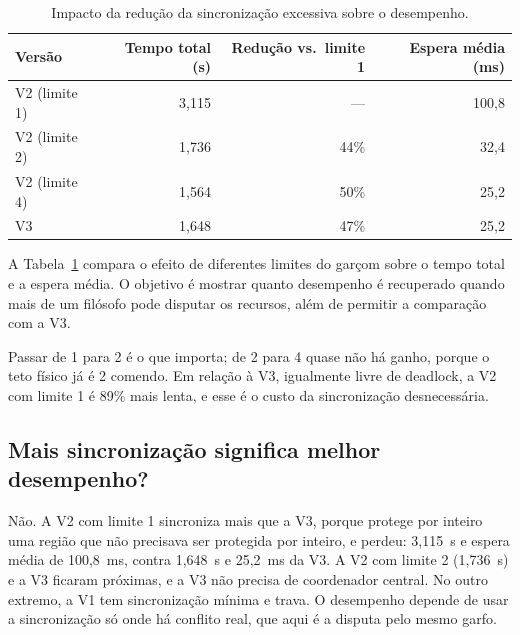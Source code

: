 \documentclass[12pt,brazil,a4paper]{article}
\begin{document}
\begin{table}[H]
\centering
\small
\begin{tabular}{lrrr}
\toprule
Versão & Tempo total (s) & Redução vs.\ limite 1 & Espera média (ms)\\
\midrule
V2 (limite 1) & 3,115 & --- & 100,8\\
V2 (limite 2) & 1,736 & 44\% & 32,4\\
V2 (limite 4) & 1,564 & 50\% & 25,2\\
V3 & 1,648 & 47\% & 25,2\\
\bottomrule
\end{tabular}
\caption{Impacto da redução da sincronização excessiva sobre o desempenho.}
\label{tab:impacto-sincronizacao}
\end{table}

A Tabela~\ref{tab:impacto-sincronizacao} compara o efeito de diferentes limites do garçom sobre o tempo total e a espera média. O objetivo é mostrar quanto desempenho é recuperado quando mais de um filósofo pode disputar os recursos, além de permitir a comparação com a V3.

Passar de 1 para 2 é o que importa; de 2 para 4 quase não há ganho, porque o teto físico já é 2 comendo. Em relação à V3, igualmente livre de deadlock, a V2 com limite 1 é 89\% mais lenta, e esse é o custo da sincronização desnecessária.

\subsection{Mais sincronização significa melhor desempenho?}
Não. A V2 com limite 1 sincroniza mais que a V3, porque protege por inteiro uma região que não precisava ser protegida por inteiro, e perdeu: 3,115~s e espera média de 100,8~ms, contra 1,648~s e 25,2~ms da V3. A V2 com limite 2 (1,736~s) e a V3 ficaram próximas, e a V3 não precisa de coordenador central. No outro extremo, a V1 tem sincronização mínima e trava. O desempenho depende de usar a sincronização só onde há conflito real, que aqui é a disputa pelo mesmo garfo.

\end{document}
